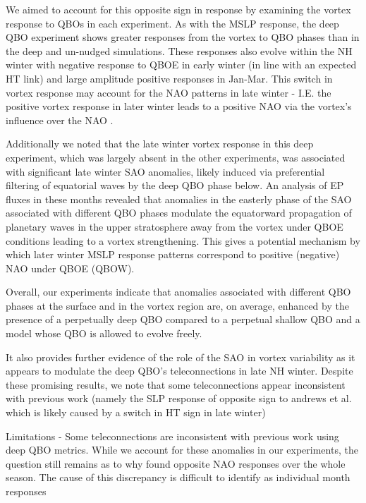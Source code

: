 We aimed to account for this opposite sign in response by examining the vortex response to QBOs in each experiment. As with the MSLP response, the deep QBO experiment shows greater responses from the vortex to QBO phases than in the deep and un-nudged simulations. These responses also evolve within the NH winter with negative response to QBOE in early winter (in line with an expected HT link) and large amplitude positive responses in Jan-Mar. This switch in vortex response may account for the NAO patterns in late winter - I.E. the positive vortex response in later winter leads to a positive NAO via the vortex's influence over the NAO \citep{charlton-perezInfluence2018e}. 

Additionally we noted that the late winter vortex response in this deep experiment, which was largely absent in the other experiments, was associated with significant late winter SAO anomalies, likely induced via preferential filtering of equatorial waves by the deep QBO phase below. An analysis of EP fluxes in these months revealed that anomalies in the easterly phase of the SAO associated with different QBO phases modulate the equatorward propagation of planetary waves in the upper stratosphere away from the vortex under QBOE conditions leading to a vortex strengthening. This gives a potential mechanism by which later winter MSLP response patterns correspond to positive (negative) NAO under QBOE (QBOW). 

Overall, our experiments indicate that anomalies associated with different QBO phases at the surface and in the vortex region are, on average, enhanced by the presence of a perpetually deep QBO compared to a perpetual shallow QBO and a model whose QBO is allowed to evolve freely. 

It also provides further evidence of the role of the SAO in vortex variability as it appears to modulate the deep QBO's teleconnections in late NH winter. Despite these promising results, we note that some teleconnections appear inconsistent with previous work (namely the SLP response of opposite sign to andrews et al. which is likely caused by a switch in HT sign in late winter) 

Limitations
- Some teleconnections are inconsistent with previous work using deep QBO metrics. While we account for these anomalies in our experiments, the question still remains as to why \cite{andrewsObserved2019d} found opposite NAO responses over the whole season. The cause of this discrepancy is difficult to identify as individual month responses 

